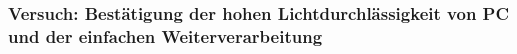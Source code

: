 \subsubsection{Versuch: Bestätigung der hohen Lichtdurchlässigkeit von PC und der einfachen Weiterverarbeitung}
